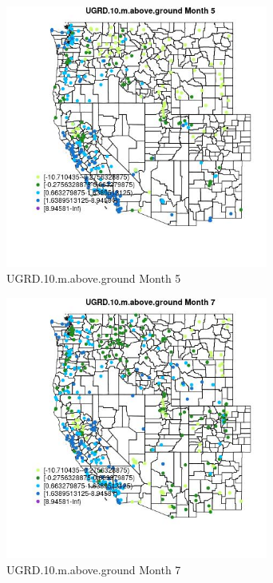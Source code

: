 \begin{figure} 
\centering  
\includegraphics[width=0.77\textwidth]{Code_Outputs/Report_ML_input_PM25_Step4_part_e_de_duplicated_aves_compiled_2019-05-18wNAs_MapObsMo5UGRD10maboveground.jpg} 
\caption{\label{fig:Report_ML_input_PM25_Step4_part_e_de_duplicated_aves_compiled_2019-05-18wNAsMapObsMo5UGRD10maboveground}UGRD.10.m.above.ground Month 5} 
\end{figure} 
 

\begin{figure} 
\centering  
\includegraphics[width=0.77\textwidth]{Code_Outputs/Report_ML_input_PM25_Step4_part_e_de_duplicated_aves_compiled_2019-05-18wNAs_MapObsMo7UGRD10maboveground.jpg} 
\caption{\label{fig:Report_ML_input_PM25_Step4_part_e_de_duplicated_aves_compiled_2019-05-18wNAsMapObsMo7UGRD10maboveground}UGRD.10.m.above.ground Month 7} 
\end{figure} 
 

